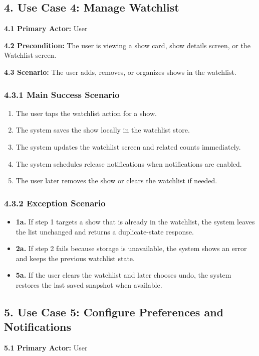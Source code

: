 \subsection*{4. Use Case 4: Manage Watchlist}
\noindent\textbf{4.1 Primary Actor:} User

\noindent\textbf{4.2 Precondition:} The user is viewing a show card, show details screen, or the Watchlist screen.

\noindent\textbf{4.3 Scenario:} The user adds, removes, or organizes shows in the watchlist.

\subsubsection*{4.3.1 Main Success Scenario}
\begin{enumerate}[label=\arabic*.]
	\item The user taps the watchlist action for a show.
	\item The system saves the show locally in the watchlist store.
	\item The system updates the watchlist screen and related counts immediately.
	\item The system schedules release notifications when notifications are enabled.
	\item The user later removes the show or clears the watchlist if needed.
\end{enumerate}

\subsubsection*{4.3.2 Exception Scenario}
\begin{itemize}
	\item \textbf{1a.} If step 1 targets a show that is already in the watchlist, the system leaves the list unchanged and returns a duplicate-state response.
	\item \textbf{2a.} If step 2 fails because storage is unavailable, the system shows an error and keeps the previous watchlist state.
	\item \textbf{5a.} If the user clears the watchlist and later chooses undo, the system restores the last saved snapshot when available.
\end{itemize}

\subsection*{5. Use Case 5: Configure Preferences and Notifications}
\noindent\textbf{5.1 Primary Actor:} User

